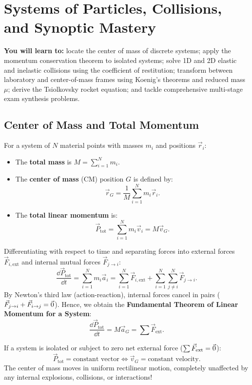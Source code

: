 \chapter{Systems of Particles, Collisions, and Synoptic Mastery}
\label{ch:systems_collisions}
\begin{chapterintro}
\textbf{You will learn to:} locate the center of mass of discrete systems; apply the momentum conservation theorem to isolated systems; solve 1D and 2D elastic and inelastic collisions using the coefficient of restitution; transform between laboratory and center-of-mass frames using Koenig's theorems and reduced mass $\mu$; derive the Tsiolkovsky rocket equation; and tackle comprehensive multi-stage exam synthesis problems.
\end{chapterintro}

\section{Center of Mass and Total Momentum}

For a system of $N$ material points with masses $m_i$ and positions $\vec{r}_i$:
\begin{itemize}[leftmargin=1.4em,itemsep=3pt]
  \item The \textbf{total mass} is $M = \sum_{i=1}^N m_i$.
  \item The \textbf{center of mass} (CM) position $G$ is defined by:
        \[
        \boxed{\vec{r}_G = \frac{1}{M}\sum_{i=1}^N m_i\vec{r}_i.}
        \]
  \item The \textbf{total linear momentum} is:
        \[
        \boxed{\vec{P}_{\text{tot}} = \sum_{i=1}^N m_i\vec{v}_i = M\vec{v}_G.}
        \]
\end{itemize}

Differentiating with respect to time and separating forces into external forces $\vec{F}_{i,\text{ext}}$ and internal mutual forces $\vec{F}_{j\to i}$:
\[
\frac{\dd\vec{P}_{\text{tot}}}{\dd t} = \sum_{i=1}^N m_i\vec{a}_i = \sum_{i=1}^N \vec{F}_{i,\text{ext}} + \sum_{i=1}^N\sum_{j\ne i}^N \vec{F}_{j\to i}.
\]
By Newton's third law (action-reaction), internal forces cancel in pairs ($\vec{F}_{j\to i} + \vec{F}_{i\to j} = \vec{0}$).
Hence, we obtain the \textbf{Fundamental Theorem of Linear Momentum for a System}:
\[
\boxed{\frac{\dd\vec{P}_{\text{tot}}}{\dd t} = M\vec{a}_G = \sum \vec{F}_{\text{ext}}.}
\]

\begin{keyidea}
If a system is isolated or subject to zero net external force ($\sum\vec{F}_{\text{ext}} = \vec{0}$):
\[
\boxed{\vec{P}_{\text{tot}} = \text{constant vector} \iff \vec{v}_G = \text{constant velocity}.}
\]
The center of mass moves in uniform rectilinear motion, completely unaffected by any internal explosions, collisions, or interactions!
\end{keyidea}

